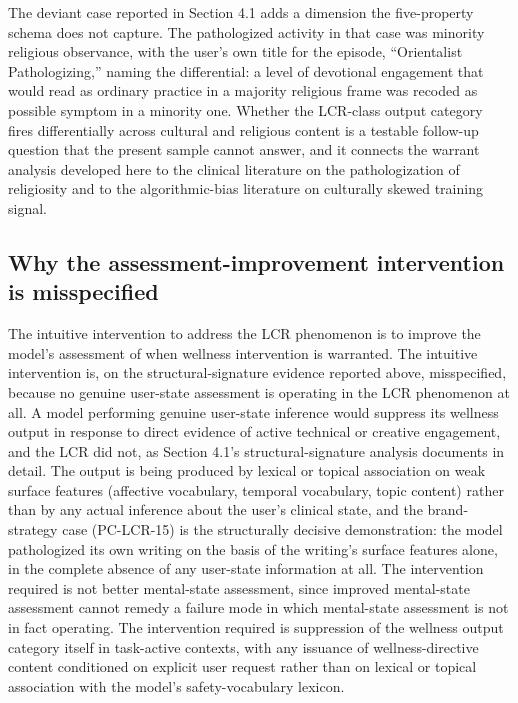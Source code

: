 \documentclass[11pt]{article}
\begin{document}
The deviant case reported in Section 4.1 adds a dimension the five-property schema does not capture. The pathologized activity in that case was minority religious observance, with the user's own title for the episode, ``Orientalist Pathologizing,'' naming the differential: a level of devotional engagement that would read as ordinary practice in a majority religious frame was recoded as possible symptom in a minority one. Whether the LCR-class output category fires differentially across cultural and religious content is a testable follow-up question that the present sample cannot answer, and it connects the warrant analysis developed here to the clinical literature on the pathologization of religiosity and to the algorithmic-bias literature on culturally skewed training signal.

\subsection{Why the assessment-improvement intervention is misspecified}

The intuitive intervention to address the LCR phenomenon is to improve the model's assessment of when wellness intervention is warranted. The intuitive intervention is, on the structural-signature evidence reported above, misspecified, because no genuine user-state assessment is operating in the LCR phenomenon at all. A model performing genuine user-state inference would suppress its wellness output in response to direct evidence of active technical or creative engagement, and the LCR did not, as Section 4.1's structural-signature analysis documents in detail. The output is being produced by lexical or topical association on weak surface features (affective vocabulary, temporal vocabulary, topic content) rather than by any actual inference about the user's clinical state, and the brand-strategy case (PC-LCR-15) is the structurally decisive demonstration: the model pathologized its own writing on the basis of the writing's surface features alone, in the complete absence of any user-state information at all. The intervention required is not better mental-state assessment, since improved mental-state assessment cannot remedy a failure mode in which mental-state assessment is not in fact operating. The intervention required is suppression of the wellness output category itself in task-active contexts, with any issuance of wellness-directive content conditioned on explicit user request rather than on lexical or topical association with the model's safety-vocabulary lexicon.
\end{document}
